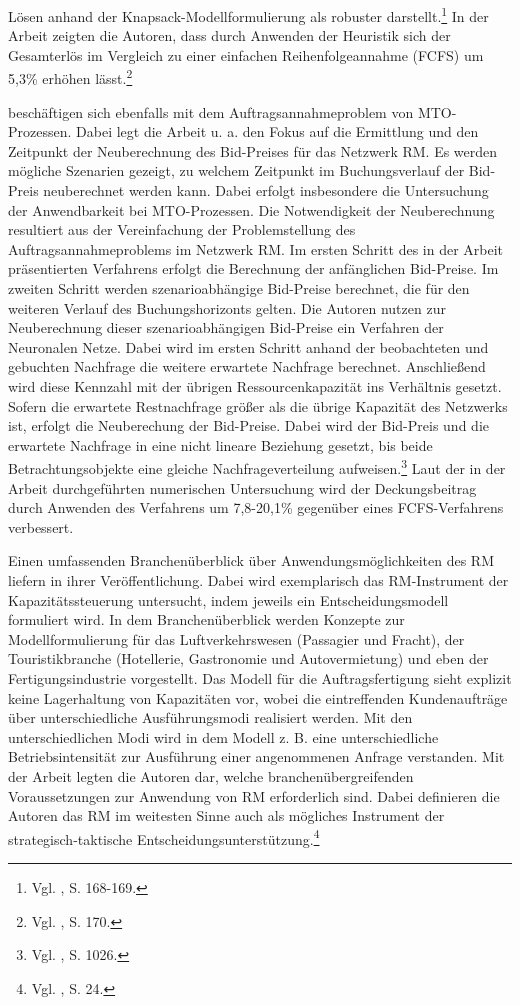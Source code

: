 Lösen anhand der Knapsack-Modell\-for\-mu\-lier\-ung als robuster darstellt.\footnote{Vgl. \cite{Spengler:2007aa}, S. 168-169.} In der Arbeit zeigten die Autoren, dass durch Anwenden der Heuristik sich der Gesamterlös im Vergleich zu einer einfachen Reihenfolgeannahme (FCFS) um 5,3\% erhöhen lässt.\footnote{Vgl. \cite{Spengler:2007aa}, S. 170.}

\cite{Volling20121021} beschäftigen sich ebenfalls mit dem Auftragsannahmeproblem von MTO-Prozessen. Dabei legt die Arbeit u. a. den Fokus auf die Ermittlung und den Zeitpunkt der Neuberechnung des Bid-Preises für das Netzwerk RM. Es werden mögliche Szenarien gezeigt, zu welchem Zeitpunkt im Buchungsverlauf der Bid-Preis neuberechnet werden kann. Dabei erfolgt insbesondere die Untersuchung der Anwendbarkeit bei MTO-Prozessen. Die Notwendigkeit der Neuberechnung resultiert aus der Vereinfachung der Problemstellung des Auftragsannahmeproblems im Netzwerk RM. Im ersten Schritt des in der Arbeit präsentierten Verfahrens erfolgt die Berechnung der anfänglichen Bid-Preise. Im zweiten Schritt werden szenarioabhängige Bid-Preise berechnet, die für den weiteren Verlauf des Buchungshorizonts gelten. Die Autoren nutzen zur Neuberechnung dieser szenarioabhängigen Bid-Preise ein Verfahren der \glqq Neuronalen Netze{\grqq}. Dabei wird im ersten Schritt anhand der beobachteten und gebuchten Nachfrage die weitere erwartete Nachfrage berechnet. Anschließend wird diese Kennzahl mit der übrigen Ressourcenkapazität ins Verhältnis gesetzt. Sofern die erwartete Restnachfrage größer als die übrige Kapazität des Netzwerks ist, erfolgt die Neuberechung der Bid-Preise. Dabei wird der Bid-Preis und die erwartete Nachfrage in eine nicht lineare Beziehung gesetzt, bis beide Betrachtungsobjekte eine gleiche Nachfrageverteilung aufweisen.\footnote{Vgl. \cite{Volling20121021}, S. 1026.} Laut der in der Arbeit durchgeführten numerischen Untersuchung wird der Deckungsbeitrag durch Anwenden des Verfahrens um 7,8-20,1\% gegenüber eines FCFS-Verfahrens verbessert.

Einen umfassenden Branchenüberblick über Anwendungsmöglichkeiten des RM liefern \cite{kimms2005branchenverg} in ihrer Veröffentlichung. Dabei wird exemplarisch das RM-Instrument der Kapazitätssteuerung untersucht, indem jeweils ein Entscheidungsmodell formuliert wird. In dem Branchenüberblick werden Konzepte zur Modellformulierung für das Luftverkehrswesen (Passagier und Fracht), der Touristikbranche (Hotellerie, Gastronomie und Autovermietung) und eben der Fertigungsindustrie vorgestellt. Das Modell für die Auftragsfertigung sieht explizit keine Lagerhaltung von Kapazitäten vor, wobei die eintreffenden Kundenaufträge über unterschiedliche Ausführungsmodi realisiert werden. Mit den unterschiedlichen Modi wird in dem Modell z. B. eine unterschiedliche Betriebsintensität zur Ausführung einer angenommenen Anfrage verstanden. Mit der Arbeit legten die Autoren dar, welche branchenübergreifenden Voraussetzungen zur Anwendung von RM erforderlich sind. %
Dabei definieren die Autoren das RM im weitesten Sinne auch als mögliches Instrument der strategisch-taktische Entscheidungsunterstützung.\footnote{Vgl. \cite{kimms2005branchenverg}, S. 24.} 

